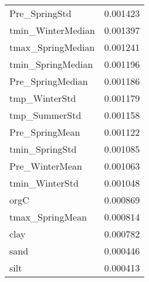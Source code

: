 \begin{tabular}{lr}
Pre_SpringStd & 0.001423 \\
tmin_WinterMedian & 0.001397 \\
tmax_SpringMedian & 0.001241 \\
tmin_SpringMedian & 0.001196 \\
Pre_SpringMedian & 0.001186 \\
tmp_WinterStd & 0.001179 \\
tmp_SummerStd & 0.001158 \\
Pre_SpringMean & 0.001122 \\
tmin_SpringStd & 0.001085 \\
Pre_WinterMean & 0.001063 \\
tmin_WinterStd & 0.001048 \\
orgC & 0.000869 \\
tmax_SpringMean & 0.000814 \\
clay & 0.000782 \\
sand & 0.000446 \\
silt & 0.000413 \\
\bottomrule
\end{tabular}
